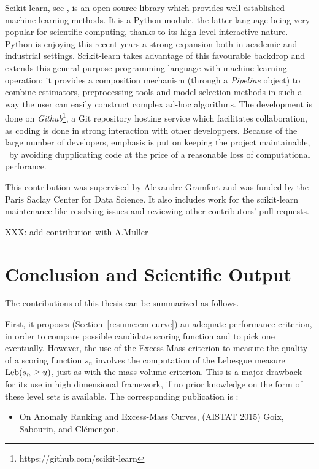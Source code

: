 Scikit-learn, see \cite{sklearn2011}, is an open-source library which provides well-established machine learning methods.
It is a Python module, the latter language being very popular for scientific computing, thanks to its high-level interactive nature. Python is enjoying this recent years a strong expansion both in academic and industrial settings. Scikit-learn takes advantage of this favourable backdrop and extends this general-purpose programming language with machine learning operation: %
it provides a composition mechanism (through a \emph{Pipeline} object) to combine estimators, preprocessing tools and model selection methods in such a way the user can easily construct complex ad-hoc algorithms.
%
The development is done on \emph{Github}\footnote{https://github.com/scikit-learn}, a Git repository hosting service which facilitates collaboration, as coding is done in strong interaction with other developpers. Because of the large number of developers, emphasis is put on keeping the project maintainable, \eg~by avoiding dupplicating code at the price of a reasonable loss of computational perforance.%


This contribution was supervised by Alexandre Gramfort and was funded by the Paris Saclay Center for Data Science. It also includes work for the scikit-learn maintenance like resolving issues and reviewing other contributors' pull requests.

XXX: add contribution with A.Muller


\section{Conclusion and Scientific Output}
The contributions of this thesis can be summarized as follows. 

First, it proposes (Section~\ref{resume:em-curve}) an adequate performance criterion, in order to compare possible candidate scoring function and to pick one eventually. 
However, the use of the Excess-Mass criterion to measure the quality of a scoring function $s_n$ involves the computation of the Lebesgue measure  $\text{Leb}(s_n \ge u)$, just as with the mass-volume criterion. This is a major drawback for its use in high dimensional framework, if no prior knowledge on the form of these level sets is available. The corresponding publication is \cite{AISTAT15}:
\begin{itemize}
\item On Anomaly Ranking and Excess-Mass Curves, (AISTAT 2015) Goix, Sabourin, and Clémençon. 
\end{itemize}

